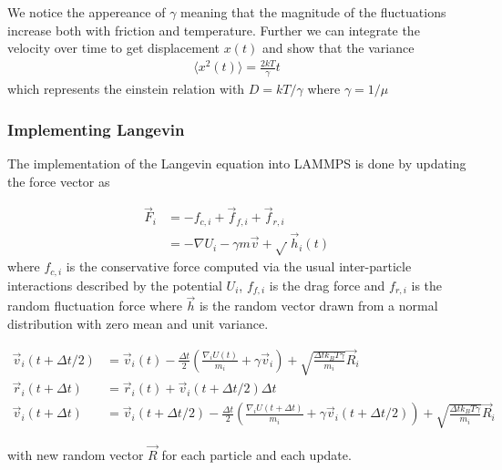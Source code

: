We notice the appereance of $\gamma$ meaning that the magnitude of the fluctuations increase both with friction and temperature. Further we can integrate the velocity over time to get displacement $x(t)$ and show that the variance 
\begin{align*}
  \langle x^2(t) \rangle = \frac{2 kT}{\gamma } t
\end{align*}
which represents the einstein relation with $D = kT/\gamma$ where $\gamma = 1/\mu$


\subsubsection{Implementing Langevin}




The implementation of the Langevin equation into LAMMPS is done by updating the force vector as 

\begin{align*}
  \vec{F}_i &= -f_{c,i} + \vec{f}_{f,i} + \vec{f}_{r,i} \nonumber \\
  &= -\nabla U_i - \gamma m \vec{v} + \sqrt{\frac{}{}}\vec{h}_i(t)
\end{align*}
where $f_{c,i}$ is the conservative force computed via the usual inter-particle interactions described by the potential $U_i$, $f_{f,i}$ is the drag force and $f_{r,i}$ is the random fluctuation force where $\vec{h}$ is the random vector drawn from a normal distribution with zero mean and unit variance. 

\begin{align*}
  \vec{v}_i(t + \Delta t/2)  &= \vec{v}_i(t) - \frac{\Delta t}{2}\left(\frac{\nabla_i U(t)}{m_i} + \gamma \vec{v}_i \right) + \sqrt{\frac{\Delta t k_B T \gamma }{m_i}} \vec{R}_i \\ 
  \vec{r}_i(t + \Delta t) &= \vec{r}_i(t) + \vec{v}_i(t + \Delta t /2) \Delta t \\
  \vec{v}_i(t + \Delta t) &= \vec{v}_i(t+ \Delta t/2) - \frac{\Delta t}{2}\left(\frac{\nabla_i U(t + \Delta t)}{m_i} + \gamma \vec{v}_i(t + \Delta t/2) \right) + \sqrt{\frac{\Delta t k_B T \gamma }{m_i}} \vec{R}_i
\end{align*}

with new random vector $\vec{R}$ for each particle and each update. 


